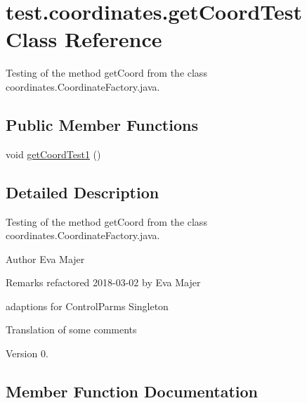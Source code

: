\hypertarget{classtest_1_1coordinates_1_1get_coord_test}{}\section{test.\+coordinates.\+get\+Coord\+Test Class Reference}
\label{classtest_1_1coordinates_1_1get_coord_test}


Testing of the method get\+Coord from the class coordinates.\+Coordinate\+Factory.\+java.  


\subsection*{Public Member Functions}
\begin{DoxyCompactItemize}
\item 
void \hyperlink{classtest_1_1coordinates_1_1get_coord_test_a1f625923808029c32bf3eda26256f143}{get\+Coord\+Test1} ()
\end{DoxyCompactItemize}


\subsection{Detailed Description}
Testing of the method get\+Coord from the class coordinates.\+Coordinate\+Factory.\+java. 

\begin{DoxyAuthor}{Author}
Eva Majer 
\end{DoxyAuthor}
\begin{DoxyRemark}{Remarks}
refactored 2018-\/03-\/02 by Eva Majer ~\newline
 
\begin{DoxyItemize}
\item adaptions for Control\+Parms Singleton 
\item Translation of some comments 
\end{DoxyItemize}
\end{DoxyRemark}
\begin{DoxyVersion}{Version}
0. 
\end{DoxyVersion}


\subsection{Member Function Documentation}
\mbox{\label{classtest_1_1coordinates_1_1get_coord_test_a1f625923808029c32bf3eda26256f143}} 
